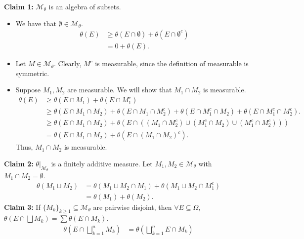 \documentclass[9pt]{extarticle}
\begin{document}
\begin{description}
        \textbf{Claim 1:} $\mathcal{M}_{\theta}$ is an algebra of subsets.
          \begin{itemize}
            \item We have that $\emptyset\in \mathcal{M}_{\theta}$.
              \begin{align*}
                \theta(E) &\geq \theta(E\cap \emptyset) + \theta(E\cap \emptyset^{c})\\
                          &= 0 + \theta(E).
              \end{align*}
            \item Let $M\in \mathcal{M}_{\theta}$. Clearly, $M^{c}$ is measurable, since the definition of measurable is symmetric.
            \item Suppose $M_1,M_2$ are measurable. We will show that $M_1\cap M_2$ is measurable.
              \begin{align*}
                \theta(E) &\geq \theta(E\cap M_1) + \theta(E \cap M_{1}^{c})\\
                          &\geq \theta(E\cap M_1\cap M_2) + \theta(E\cap M_1 \cap M_{2}^{c}) + \theta(E\cap M_1^{c}\cap M_2) + \theta(E\cap M_{1}^{c} \cap M_{2}^{c}).\\
                          &\geq \theta(E\cap M_1 \cap M_2) + \theta\left(E \cap(\left(M_1\cap M_2^{c}\right) \cup \left(M_1^{c}\cap M_{2}\right) \cup \left(M_1^{c} \cap M_{2}^{c}\right) )\right)\\
                          &= \theta(E \cap M_1\cap M_2) + \theta(E\cap \left(M_1\cap M_2\right)^{c}).
              \end{align*}
              Thus, $M_1\cap M_2$ is measurable.
          \end{itemize}
          \textbf{Claim 2:} $\theta|_{\mathcal{M}_{\theta}}$ is a finitely additive measure. Let $M_1,M_2\in \mathcal{M}_{\theta}$ with $M_1\cap M_2 = \emptyset$.
          \begin{align*}
            \theta(M_1\sqcup M_2) &= \theta(M_1\sqcup M_2 \cap M_1) + \theta(M_1\sqcup M_2 \cap M_1^{c})\\
                                  &= \theta(M_1) + \theta(M_2).
          \end{align*}
          \textbf{Claim 3:} If $\{M_k\}_{k\geq 1}\subseteq \mathcal{M}_{\theta}$ are pairwise disjoint, then $\forall E\subseteq \Omega$, $\theta\left(E\cap \bigsqcup M_k\right) = \sum \theta(E\cap M_k)$.
          \begin{align*}
            \theta\left(E\cap \bigsqcup_{k=1}^{n}M_k\right) &= \theta\left(\bigsqcup_{k=1}^{n}E\cap M_k\right)

\end{align*}
\end{description}
\end{document}
